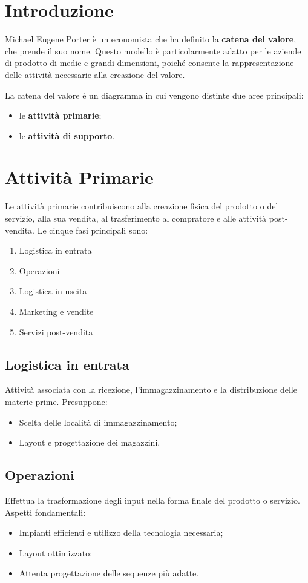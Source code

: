 
\section{Introduzione}
Michael Eugene Porter è un economista che ha definito la \textbf{catena del valore}, che prende il suo nome.  
Questo modello è particolarmente adatto per le aziende di prodotto di medie e grandi dimensioni, poiché consente la rappresentazione delle attività necessarie alla creazione del valore.

La catena del valore è un diagramma in cui vengono distinte due aree principali:
\begin{itemize}
    \item le \textbf{attività primarie};
    \item le \textbf{attività di supporto}.
\end{itemize}

\section{Attività Primarie}
Le attività primarie contribuiscono alla creazione fisica del prodotto o del servizio, alla sua vendita, al trasferimento al compratore e alle attività post-vendita.  
Le cinque fasi principali sono:
\begin{enumerate}
    \item Logistica in entrata
    \item Operazioni
    \item Logistica in uscita
    \item Marketing e vendite
    \item Servizi post-vendita
\end{enumerate}

\subsection{Logistica in entrata}
Attività associata con la ricezione, l’immagazzinamento e la distribuzione delle materie prime.  
Presuppone:
\begin{itemize}
    \item Scelta delle località di immagazzinamento;
    \item Layout e progettazione dei magazzini.
\end{itemize}

\subsection{Operazioni}
Effettua la trasformazione degli input nella forma finale del prodotto o servizio.  
Aspetti fondamentali:
\begin{itemize}
    \item Impianti efficienti e utilizzo della tecnologia necessaria;
    \item Layout ottimizzato;
    \item Attenta progettazione delle sequenze più adatte.
\end{itemize}

